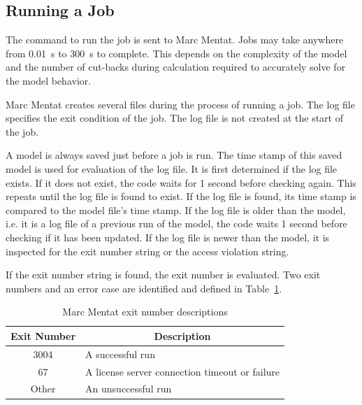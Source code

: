 \subsection{Running a Job}
\label{ssec:run}

The command to run the job is sent to Marc Mentat. Jobs may take anywhere from \SI{0.01}{\second} to \SI{300}{\second} to complete. This depends on the complexity of the model and the number of cut-backs during calculation required to accurately solve for the model behavior.

Marc Mentat creates several files during the process of running a job. The log file specifies the exit condition of the job. The log file is not created at the start of the job.

A model is always saved just before a job is run. The time stamp of this saved model is used for evaluation of the log file. It is first determined if the log file exists. If it does not exist, the code waits for 1 second before checking again. This repeats until the log file is found to exist. If the log file is found, its time stamp is compared to the model file's time stamp. If the log file is older than the model, i.e. it is a log file of a previous run of the model, the code waits 1 second before checking if it has been updated. If the log file is newer than the model, it is inspected for the exit number string or the access violation string.

If the exit number string is found, the exit number is evaluated. Two exit numbers and an error case are identified and defined in Table~\ref{tab:exno}.

\begin{table}[H]
\centering
\begin{tabular}{@{}cl@{}}
\toprule
\textbf{Exit Number} & \multicolumn{1}{c}{\textbf{Description}}       \\ \midrule
3004                 & A successful run                               \\
67                   & A license server connection timeout or failure \\
Other                & An unsuccessful run                            \\ \bottomrule
\end{tabular}
\caption{Marc Mentat exit number descriptions}
\label{tab:exno}
\end{table}

